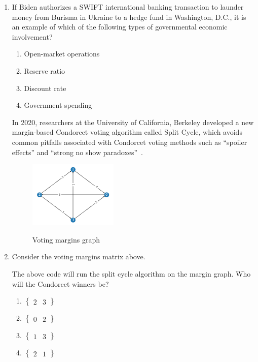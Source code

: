 \begin{enumerate}
  \item If Biden authorizes a \textsc{SWIFT} international banking
        transaction to launder money from Burisma in Ukraine to a hedge
        fund in Washington, D.C., it is an example of which of the
        following types of governmental economic involvement?
        \begin{enumerate}
          \item Open-market operations
          \item Reserve ratio
          \item Discount rate
          \item Government spending
        \end{enumerate}

        In 2020, researchers at the University of California, Berkeley
        developed a new margin-based Condorcet voting algorithm called
        Split Cycle, which avoids common pitfalls associated with
        Condorcet voting methods such as ``spoiler effects'' and
        ``strong no show paradoxes''~\cite{splitcycle}.

        \bigskip

        \begin{figure}[h]
          \centering
          \includegraphics[width=0.4\textwidth]{assets/splitcycle.png}
          \label{fig:example}
          \caption{Voting margins graph}
        \end{figure}

  \item Consider the voting margins matrix above.
        

        The above code will run the split cycle algorithm on the margin
        graph. Who will the Condorcet winners be?

        \begin{enumerate}
          \item $\begin{Bmatrix} 2 & 3 \end{Bmatrix}$
          \item $\begin{Bmatrix} 0 & 2 \end{Bmatrix}$
          \item $\begin{Bmatrix} 1 & 3 \end{Bmatrix}$
          \item $\begin{Bmatrix} 2 & 1 \end{Bmatrix}$
        \end{enumerate}
\end{enumerate}